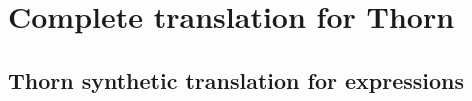 \documentclass[a4paper,USenglish]{tex/lipics-v2016}
\begin{document}
\section{Complete translation for Thorn}

% 
% 
% 
% 

\subsection{Thorn synthetic translation for expressions}

\end{document}
